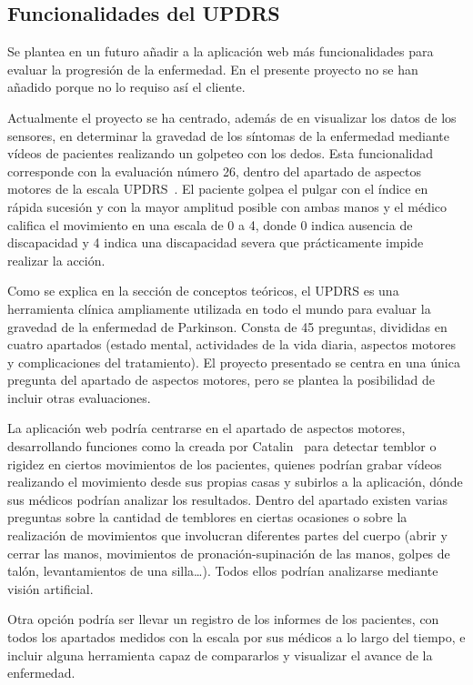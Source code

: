 \subsection{Funcionalidades del UPDRS}
Se plantea en un futuro añadir a la aplicación web más funcionalidades para evaluar la progresión de la enfermedad. En el presente proyecto no se han añadido porque no lo requiso así el cliente.

Actualmente el proyecto se ha centrado, además de en visualizar los datos de los sensores, en determinar la gravedad de los síntomas de la enfermedad mediante vídeos de pacientes realizando un golpeteo con los dedos.
Esta funcionalidad corresponde con la evaluación número 26, dentro del apartado de aspectos motores de la escala UPDRS~\cite{updrs}. El paciente golpea el pulgar con el índice en rápida sucesión y con la mayor amplitud posible con ambas manos y el médico califica el movimiento en una escala de 0 a 4, donde 0 indica ausencia de discapacidad y 4 indica una discapacidad severa que prácticamente impide realizar la acción.

Como se explica en la sección de conceptos teóricos, el UPDRS es una herramienta clínica ampliamente utilizada en todo el mundo para evaluar la gravedad de la enfermedad de Parkinson. Consta de 45 preguntas, divididas en cuatro apartados (estado mental, actividades de la vida diaria, aspectos motores y complicaciones del tratamiento). El proyecto presentado se centra en una única pregunta del apartado de aspectos motores, pero se plantea la posibilidad de incluir otras evaluaciones.

La aplicación web podría centrarse en el apartado de aspectos motores, desarrollando funciones como la creada por Catalin~\cite{TFGCatalin} para detectar temblor o rigidez en ciertos movimientos de los pacientes, quienes podrían grabar vídeos realizando el movimiento desde sus propias casas y subirlos a la aplicación, dónde sus médicos podrían analizar los resultados. Dentro del apartado existen varias preguntas sobre la cantidad de temblores en ciertas ocasiones o sobre la realización de movimientos que involucran diferentes partes del cuerpo (abrir y cerrar las manos, movimientos de pronación-supinación de las manos, golpes de talón, levantamientos de una silla\ldots). Todos ellos podrían analizarse mediante visión artificial.

Otra opción podría ser llevar un registro de los informes de los pacientes, con todos los apartados medidos con la escala por sus médicos a lo largo del tiempo, e incluir alguna herramienta capaz de compararlos y visualizar el avance de la enfermedad.


